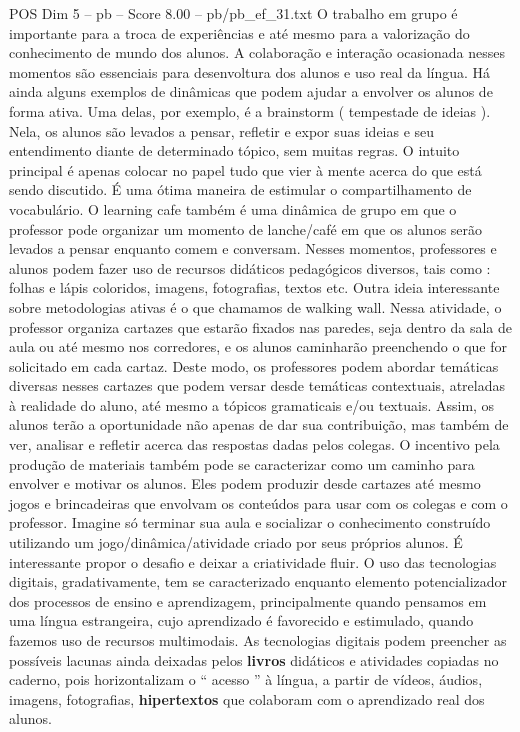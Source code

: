 \begin{textsample}{POS Dim 5 – pb – Score 8.00 – pb/pb\_ef\_31.txt}
O trabalho em grupo é importante para a troca de experiências e até mesmo para a valorização do conhecimento de mundo dos alunos.
A colaboração e interação ocasionada nesses momentos são essenciais para desenvoltura dos alunos e uso real da língua.
Há ainda alguns exemplos de dinâmicas que podem ajudar a envolver os alunos de forma ativa.
Uma delas, por exemplo, é a brainstorm ( tempestade de ideias ).
Nela, os alunos são levados a pensar, refletir e expor suas ideias e seu entendimento diante de determinado tópico, sem muitas regras.
O intuito principal é apenas colocar no papel tudo que vier à mente acerca do que está sendo discutido.
É uma ótima maneira de estimular o compartilhamento de vocabulário.
O learning cafe também é uma dinâmica de grupo em que o professor pode organizar um momento de lanche/café em que os alunos serão levados a pensar enquanto comem e conversam.
Nesses momentos, professores e alunos podem fazer uso de recursos didáticos pedagógicos diversos, tais como : folhas e lápis coloridos, imagens, fotografias, textos etc.
Outra ideia interessante sobre metodologias ativas é o que chamamos de walking wall.
Nessa atividade, o professor organiza cartazes que estarão fixados nas paredes, seja dentro da sala de aula ou até mesmo nos corredores, e os alunos caminharão preenchendo o que for solicitado em cada cartaz.
Deste modo, os professores podem abordar temáticas diversas nesses cartazes que podem versar desde temáticas contextuais, atreladas à realidade do aluno, até mesmo a tópicos gramaticais e/ou textuais.
Assim, os alunos terão a oportunidade não apenas de dar sua contribuição, mas também de ver, analisar e refletir acerca das respostas dadas pelos colegas.
O incentivo pela produção de materiais também pode se caracterizar como um caminho para envolver e motivar os alunos.
Eles podem produzir desde cartazes até mesmo jogos e brincadeiras que envolvam os conteúdos para usar com os colegas e com o professor.
Imagine só terminar sua aula e socializar o conhecimento construído utilizando um jogo/dinâmica/atividade criado por seus próprios alunos.
É interessante propor o desafio e deixar a criatividade fluir.
O uso das tecnologias digitais, gradativamente, tem se caracterizado enquanto elemento potencializador dos processos de ensino e aprendizagem, principalmente quando pensamos em uma língua estrangeira, cujo aprendizado é favorecido e estimulado, quando fazemos uso de recursos multimodais.
As tecnologias digitais podem preencher as possíveis lacunas ainda deixadas pelos \textbf{livros} didáticos e atividades copiadas no caderno, pois horizontalizam o “ acesso ” à língua, a partir de vídeos, áudios, imagens, fotografias, \textbf{hipertextos} que colaboram com o aprendizado real dos alunos.

\end{textsample}
